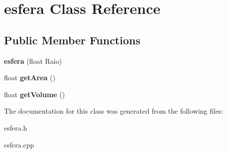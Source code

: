 \hypertarget{classesfera}{}\section{esfera Class Reference}
\label{classesfera}
\subsection*{Public Member Functions}
\begin{DoxyCompactItemize}
\item 
\mbox{\label{classesfera_a762e1a57578e9e8097c5191bd5b237a6}} 
{\bfseries esfera} (float Raio)
\item 
\mbox{\label{classesfera_a19e30591416ffb5ae58df613950f0ee7}} 
float {\bfseries get\+Area} ()
\item 
\mbox{\label{classesfera_a8b0c9091d027eef8d17a3583058eefbb}} 
float {\bfseries get\+Volume} ()
\end{DoxyCompactItemize}


The documentation for this class was generated from the following files\+:\begin{DoxyCompactItemize}
\item 
esfera.\+h\item 
esfera.\+cpp\end{DoxyCompactItemize}
